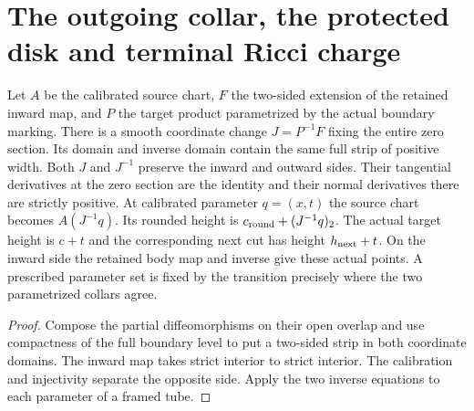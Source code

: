 \section{The outgoing collar, the protected disk and terminal Ricci charge}
\label{sec:ed03-collar-charge}

\begin{theorem}
\label{thm:ed03-actual-collar-transition}
\leanok
Let $A$ be the calibrated source chart, $F$ the two-sided extension of
the retained inward map, and $P$ the target product parametrized by the
actual boundary marking. There is a smooth coordinate change
$J=P^{-1}F$ fixing the entire zero section. Its domain and inverse domain
contain the same full strip of positive width. Both $J$ and $J^{-1}$
preserve the inward and outward sides. Their tangential derivatives at the zero section are the identity and their normal derivatives there are strictly positive. At calibrated parameter $q=(x,t)$
the source chart becomes $A(J^{-1}q)$. Its rounded height is
$c_{\rm round}+(J^{-1}q)_2$. The actual target height is $c+t$
and the corresponding next cut has height $h_{\rm next}+t$.
On the inward side the retained body map and inverse give these actual
points. A prescribed parameter set is fixed by the transition precisely
where the two parametrized collars agree.
\end{theorem}
\begin{proof}
\leanok
Compose the partial diffeomorphisms on their open overlap and use
compactness of the full boundary level to put a two-sided strip in both
coordinate domains. The inward map takes strict interior to strict
interior. The calibration and injectivity separate the opposite side.
Apply the two inverse equations to each parameter of a framed tube.
\end{proof}

